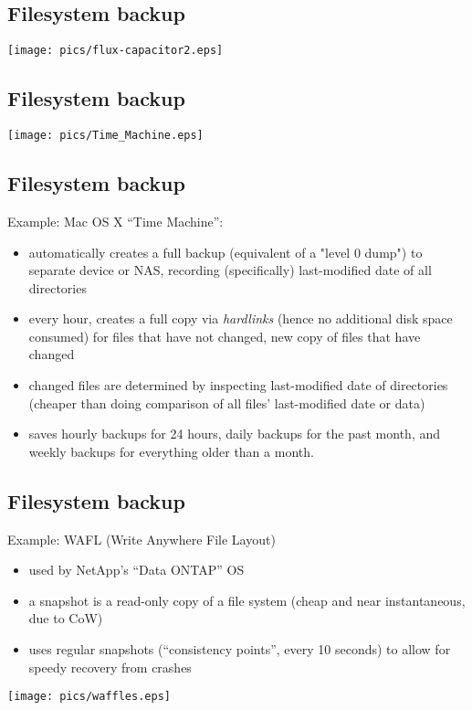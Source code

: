 \documentclass[xga]{xdvislides}
\begin{document}
\subsection{Filesystem backup}
\vspace*{\fill}
\begin{center}
	\texttt{[image: pics/flux-capacitor2.eps]}
\end{center}
\vspace*{\fill}

\subsection{Filesystem backup}
\vspace*{\fill}
\begin{center}
	\texttt{[image: pics/Time\_Machine.eps]}
\end{center}
\vspace*{\fill}


\subsection{Filesystem backup}
Example: Mac OS X ``Time Machine'':
\begin{itemize}
	\item automatically creates a full backup (equivalent of a "level 0 dump")
		to separate device or NAS, recording (specifically) last-modified date
		of all directories
	\item every hour, creates a full copy via {\em hardlinks} (hence no
		additional disk space consumed) for files that have not changed,
		new copy of files that have changed
		\item changed files are determined by inspecting last-modified date of
			directories (cheaper than doing comparison of all files'
			last-modified date or data)
	\item saves hourly backups for 24 hours, daily backups for
		the past month, and weekly backups for everything older than a month.
\end{itemize}

\subsection{Filesystem backup}
Example: WAFL (Write Anywhere File Layout)
\begin{itemize}
	\item used by NetApp's ``Data ONTAP'' OS
	\item a snapshot is a read-only copy of a file system (cheap and near
		instantaneous, due to CoW)
	\item uses regular snapshots (``consistency points'', every 10 seconds)
		to allow for speedy recovery from crashes
\end{itemize}
\vspace*{\fill}
\begin{center}
	\texttt{[image: pics/waffles.eps]}
\end{center}
\vspace*{\fill}
\end{document}
